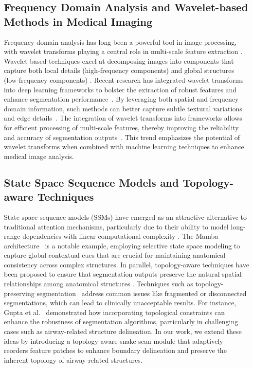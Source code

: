 \subsection{Frequency Domain Analysis and Wavelet-based Methods in Medical Imaging}
Frequency domain analysis has long been a powerful tool in image processing, with wavelet transforms playing a central role in multi-scale feature extraction \cite{sun2021mwq}. 
Wavelet-based techniques excel at decomposing images into components that capture both local details (high-frequency components) and global structures (low-frequency components) \cite{liang2024rskd}. 
Recent research has integrated wavelet transforms into deep learning frameworks to bolster the extraction of robust features and enhance segmentation performance~\cite{tan2024wavelet,yang2024sffnet}. By leveraging both spatial and frequency domain information, such methods can better capture subtle textural variations and edge details~\cite{liu2024freqsnet}. 
The integration of wavelet transforms into frameworks allows for efficient processing of multi-scale features, thereby improving the reliability and accuracy of segmentation outputs~\cite{qian2024adaptive}. 
This trend emphasizes the potential of wavelet transforms when combined with machine learning techniques to enhance medical image analysis.

\subsection{State Space Sequence Models and Topology-aware Techniques}
State space sequence models (SSMs) have emerged as an attractive alternative to traditional attention mechanisms, particularly due to their ability to model long-range dependencies with linear computational complexity \cite{zhu2024vision}. 
The Mamba architecture~\cite{gu2023mamba} is a notable example, employing selective state space modeling to capture global contextual cues that are crucial for maintaining anatomical consistency across complex structures. 
In parallel, topology-aware techniques have been proposed to ensure that segmentation outputs preserve the natural spatial relationships among anatomical structures \cite{sadikine2024deep,puunsupervised}. 
Techniques such as topology-preserving segmentation~\cite{santhirasekaram2023topology,shi2023nextou} address common issues like fragmented or disconnected segmentations, which can lead to clinically unacceptable results. 
For instance, Gupta et al.~\cite{gupta2022learning} demonstrated how incorporating topological constraints can enhance the robustness of segmentation algorithms, particularly in challenging cases such as airway-related structure delineation.
In our work, we extend these ideas by introducing a topology-aware snake-scan module that adaptively reorders feature patches to enhance boundary delineation and preserve the inherent topology of airway-related structures.

